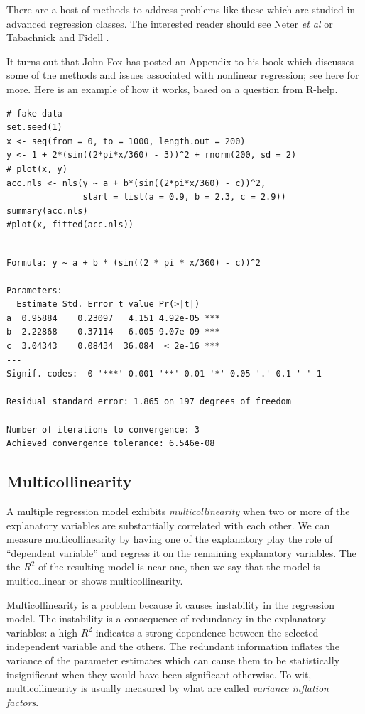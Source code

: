 \documentclass[captions=tableheading]{scrbook}
\begin{document}
There are a host of methods to address problems like these which are studied in advanced regression classes. The interested reader should see Neter \emph{et al} \cite{Neter1996} or Tabachnick and Fidell \cite{Tabachnick2006}. 

It turns out that John Fox has posted an Appendix to his book \cite{Fox2002} which discusses some of the methods and issues associated with nonlinear regression; see \href{http://cran.r-project.org/doc/contrib/Fox-Companion/appendix.html}{here} for more.  Here is an example of how it works, based on a question from R-help.


\begin{verbatim}
# fake data 
set.seed(1) 
x <- seq(from = 0, to = 1000, length.out = 200) 
y <- 1 + 2*(sin((2*pi*x/360) - 3))^2 + rnorm(200, sd = 2)
# plot(x, y)
acc.nls <- nls(y ~ a + b*(sin((2*pi*x/360) - c))^2, 
               start = list(a = 0.9, b = 2.3, c = 2.9))
summary(acc.nls)
#plot(x, fitted(acc.nls))
\end{verbatim}


\begin{verbatim}
 
Formula: y ~ a + b * (sin((2 * pi * x/360) - c))^2

Parameters:
  Estimate Std. Error t value Pr(>|t|)    
a  0.95884    0.23097   4.151 4.92e-05 ***
b  2.22868    0.37114   6.005 9.07e-09 ***
c  3.04343    0.08434  36.084  < 2e-16 ***
---
Signif. codes:  0 '***' 0.001 '**' 0.01 '*' 0.05 '.' 0.1 ' ' 1 

Residual standard error: 1.865 on 197 degrees of freedom

Number of iterations to convergence: 3 
Achieved convergence tolerance: 6.546e-08
\end{verbatim}
\subsection{Multicollinearity}
\label{sec-12-9-3}
\label{sub-Multicollinearity}


A multiple regression model exhibits \emph{multicollinearity} when two or more of the explanatory variables are substantially correlated with each other. We can measure multicollinearity by having one of the explanatory play the role of ``dependent variable'' and regress it on the remaining explanatory variables. The the \(R^{2}\) of the resulting model is near one, then we say that the model is multicollinear or shows multicollinearity.

Multicollinearity is a problem because it causes instability in the regression model. The instability is a consequence of redundancy in the explanatory variables: a high \(R^{2}\) indicates a strong dependence between the selected independent variable and the others. The redundant information inflates the variance of the parameter estimates which can cause them to be statistically insignificant when they would have been significant otherwise. To wit, multicollinearity is usually measured by what are called \emph{variance inflation factors}.
\end{document}
